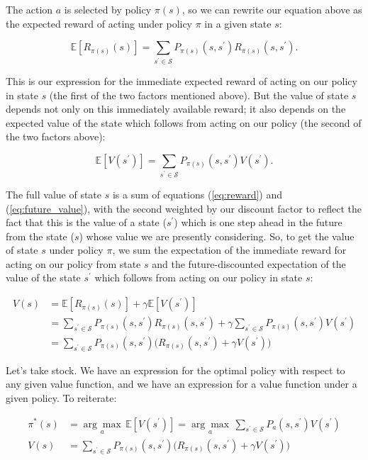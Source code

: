 \documentclass[12pt]{article}
\begin{document}
The action $a$ is selected by policy $\pi(s)$, so we can rewrite our equation above as the expected reward of acting under policy $\pi$ in a given state $s$:

\begin{equation}
\label{eq:reward} \mathbb{E}[R_{\pi(s)}(s)] = \sum_{s^\prime \in \mathscr{S}} P_{\pi(s)}(s, s^\prime) R_{\pi(s)}(s, s^\prime).
\end{equation}

This is our expression for the immediate expected reward of acting on our policy in state $s$ (the first of the two factors mentioned above). But the value of state $s$ depends not only on this immediately available reward; it also depends on the expected value of the state which follows from acting on our policy (the second of the two factors above):

\begin{equation}
\label{eq:future_value} \mathbb{E}[V(s^\prime)] = \sum_{s^\prime \in \mathscr{S}} P_{\pi(s)}(s, s^\prime) V(s^\prime).
\end{equation}

The full value of state $s$ is a sum of equations (\ref{eq:reward}) and (\ref{eq:future_value}), with the second weighted by our discount factor to reflect the fact that this is the value of a state ($s^\prime$) which is one step ahead in the future from the state ($s$) whose value we are presently considering. So, to get the value of state $s$ under policy $\pi$, we sum the expectation of the immediate reward for acting on our policy from state $s$ and the future-discounted expectation of the value of the state $s^\prime$ which follows from acting on our policy in state $s$:

\begin{align}
V(s) &= \mathbb{E}[R_{\pi(s)}(s)] + \gamma \mathbb{E}[V(s^\prime)] \\[5pt]
&= \sum_{s^\prime \in \mathscr{S}} P_{\pi(s)}(s, s^\prime) R_{\pi(s)}(s, s^\prime) + \gamma \sum_{s^\prime \in \mathscr{S}} P_{\pi(s)}(s, s^\prime) V(s^\prime) \\[5pt]
&= \sum_{s^\prime \in \mathscr{S}} P_{\pi(s)}(s, s^\prime) \Big(R_{\pi(s)}(s, s^\prime) + \gamma V(s^\prime)\Big)
\end{align}

Let's take stock. We have an expression for the optimal policy with respect to any given value function, and we have an expression for a value function under a given policy. To reiterate:

\begin{align}
\pi^*(s) &= \underset{a}{\arg\max} \, \mathbb{E}[V(s^\prime)] = \underset{a}{\arg\max} \, \sum_{s^\prime \in \mathscr{S}} P_a(s, s^\prime) V(s^\prime) \\[5pt]
V(s) &= \sum_{s^\prime \in \mathscr{S}} P_{\pi(s)}(s, s^\prime) \Big(R_{\pi(s)}(s, s^\prime) + \gamma V(s^\prime)\Big)
\end{align}
\end{document}
